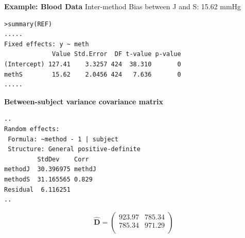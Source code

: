 \documentclass[compress]{beamer}        %
\makeatletter
\newcommand{\tcb}{\textcolor{beamer@blendedblue}}
\makeatother
\begin{document}
\begin{frame}[fragile]{\bf \tcb{Example: Blood Data}}
Inter-method Bias between J and S:         15.62 mmHg
\begin{verbatim}
>summary(REF)
.....
Fixed effects: y ~ meth
             Value Std.Error  DF t-value p-value
(Intercept) 127.41    3.3257 424  38.310       0
methS        15.62    2.0456 424   7.636       0
.....
\end{verbatim}
\end{frame}

\begin{frame}[fragile]{\bf \tcb{Between-subject variance covariance matrix }}

\begin{verbatim}
..
Random effects:
 Formula: ~method - 1 | subject
 Structure: General positive-definite
         StdDev    Corr
methodJ  30.396975 methdJ
methodS  31.165565 0.829
Residual  6.116251
..
\end{verbatim}
\[
\hat{\boldsymbol{D}} = \left(
\begin{array}{cc}
923.97	& 785.34 \\
785.34	& 971.29\\
\end{array}\right)
\]
\end{frame}
\end{document}
